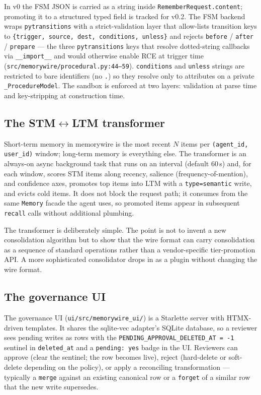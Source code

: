 \documentclass[11pt,letterpaper,twocolumn]{article}
\begin{document}
In v0 the FSM JSON is carried as a string inside \texttt{RememberRequest.content}; promoting it to a structured typed field is tracked for v0.2. The FSM backend wraps \texttt{pytransitions} with a strict-validation layer that allow-lists transition keys to \texttt{\{trigger, source, dest, conditions, unless\}} and rejects \texttt{before} / \texttt{after} / \texttt{prepare} --- the three \texttt{pytransitions} keys that resolve dotted-string callbacks via \texttt{\_\_import\_\_} and would otherwise enable RCE at trigger time (\texttt{src/memorywire/procedural.py:44--59}). \texttt{conditions} and \texttt{unless} strings are restricted to bare identifiers (no \texttt{.}) so they resolve only to attributes on a private \texttt{\_ProcedureModel}. The sandbox is enforced at two layers: validation at parse time and key-stripping at construction time.

\subsection{The STM$\leftrightarrow$LTM transformer}
\label{sec:impl-stm-ltm}

Short-term memory in memorywire is the most recent $N$ items per \texttt{(agent\_id, user\_id)} window; long-term memory is everything else. The transformer is an always-on async background task that runs on an interval (default 60\,s) and, for each window, scores STM items along recency, salience (frequency-of-mention), and confidence axes, promotes top items into LTM with a \texttt{type=semantic} write, and evicts cold items. It does not block the request path; it consumes from the same \texttt{Memory} facade the agent uses, so promoted items appear in subsequent \texttt{recall} calls without additional plumbing.

The transformer is deliberately simple. The point is not to invent a new consolidation algorithm but to show that the wire format can carry consolidation as a sequence of standard operations rather than a vendor-specific tier-promotion API. A more sophisticated consolidator drops in as a plugin without changing the wire format.

\subsection{The governance UI}
\label{sec:impl-ui}

The governance UI (\texttt{ui/src/memorywire\_ui/}) is a Starlette server with HTMX-driven templates. It shares the sqlite-vec adapter's SQLite database, so a reviewer sees pending writes as rows with the \texttt{PENDING\_APPROVAL\_DELETED\_AT = -1} sentinel in \texttt{deleted\_at} and a \texttt{pending: yes} badge in the UI. Reviewers can approve (clear the sentinel; the row becomes live), reject (hard-delete or soft-delete depending on the policy), or apply a reconciling transformation --- typically a \texttt{merge} against an existing canonical row or a \texttt{forget} of a similar row that the new write supersedes.
\end{document}
